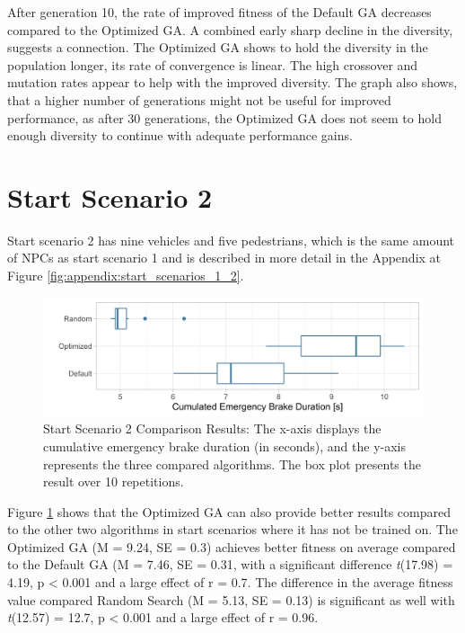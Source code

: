 After generation 10, the rate of improved fitness of the Default GA decreases compared to the Optimized GA. A combined early sharp decline in the diversity, suggests a connection. The Optimized GA shows to hold the diversity in the population longer, its rate of convergence is linear. The high crossover and mutation rates appear to help with the improved diversity. The graph also shows, that a higher number of generations might not be useful for improved performance, as after 30 generations, the Optimized GA does not seem to hold enough diversity to continue with adequate performance gains. 

\section{Start Scenario 2}
Start scenario 2 has nine vehicles and five pedestrians, which is the same amount of NPCs as start scenario 1 and is described in more detail in the Appendix at Figure \ref{fig:appendix:start_scenarios_1_2}.

\begin{figure}[ht] 
	\includegraphics[width=1\linewidth]{simulations/evaluation/plots/sim_2_comparison}
	\caption{Start Scenario 2 Comparison Results: The x-axis displays the cumulative emergency brake duration (in seconds), and the y-axis represents the three compared algorithms. The box plot presents the result over 10 repetitions.}
	\label{fig:evaluation:sim_2_comparison}
\end{figure}

Figure \ref{fig:evaluation:sim_2_comparison} shows that the Optimized GA can also provide better results compared to the other two algorithms in start scenarios where it has not be trained on. The Optimized GA (M = 9.24, SE = 0.3) achieves better fitness on average compared to the Default GA (M = 7.46, SE = 0.31, with a significant difference \textit{t}(17.98) = 4.19, p < 0.001 and a large effect of r = 0.7. The difference in the average fitness value compared Random Search (M = 5.13, SE = 0.13) is significant as well with \textit{t}(12.57) = 12.7, p < 0.001 and a large effect of r = 0.96.

